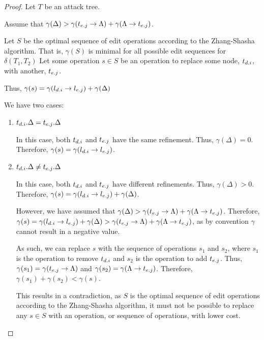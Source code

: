 \begin{proof}
    Let $T$ be an attack tree.

    Assume that $\gamma(\Delta) > \gamma(t_{{e}.{j}} \rightarrow {\Lambda}) + \gamma(\Lambda \rightarrow {t_{{e}.{j}}})$.

    Let $S$ be the optimal sequence of edit operations according to the Zhang-Shasha algorithm. That is, $\gamma(S)$ is minimal for all possible edit sequences for $\delta(T_1, T_2)$ Let some operation $s \in S$ be an operation to replace some node, $t_{{d}.{i}}$, with another, $t_{{e}.{j}}$.

    Thus, $\gamma(s) = \gamma({l_{{d}.{i}}} \rightarrow {l_{{e}.{j}}}) + \gamma(\Delta)$

    We have two cases:

    \begin{enumerate}
        \item $t_{{d}.{i}}.\Delta = t_{{e}.{j}}.\Delta$

              In this case, both $t_{{d}.{i}}$ and $t_{{e}.{j}}$ have the same refinement. Thus, $\gamma(\Delta) = 0$. Therefore, $\gamma(s) = \gamma({l_{{d}.{i}}} \rightarrow {l_{{e}.{j}}})$.

        \item $t_{{d}.{i}}.\Delta \ne t_{{e}.{j}}.\Delta$

              In this case, both $t_{{d}.{i}}$ and $t_{{e}.{j}}$ have different refinements. Thus, $\gamma(\Delta) > 0$. Therefore, $\gamma(s) = \gamma({l_{{d}.{i}}} \rightarrow {l_{{e}.{j}}}) + \gamma(\Delta)$.

              However, we have assumed that $\gamma(\Delta) > \gamma(t_{{e}.{j}} \rightarrow {\Lambda}) + \gamma(\Lambda \rightarrow {t_{{e}.{j}}})$. Therefore, $\gamma(s) = \gamma({l_{{d}.{i}}} \rightarrow {l_{{e}.{j}}}) + \gamma(\Delta) > \gamma(t_{{e}.{j}} \rightarrow {\Lambda}) + \gamma(\Lambda \rightarrow {t_{{e}.{j}}})$, as by convention $\gamma$ cannot result in a negative value.

              As such, we can replace $s$ with the sequence of operations $s_1$ and $s_2$, where $s_1$ is the operation to remove $t_{{d}.{i}}$ and $s_2$ is the operation to add $t_{{e}.{j}}$. Thus, $\gamma(s_1) = \gamma(t_{{e}.{j}} \rightarrow {\Lambda})$ and $\gamma(s_2) = \gamma(\Lambda \rightarrow {t_{{e}.{j}}})$. Therefore, $\gamma(s_1) + \gamma(s_2) < \gamma(s)$.

              This results in a contradiction, as $S$ is the optimal sequence of edit operations according to the Zhang-Shasha algorithm, it must not be possible to replace any $s \in S$ with an operation, or sequence of operations, with lower cost.
    \end{enumerate}


\end{proof}
